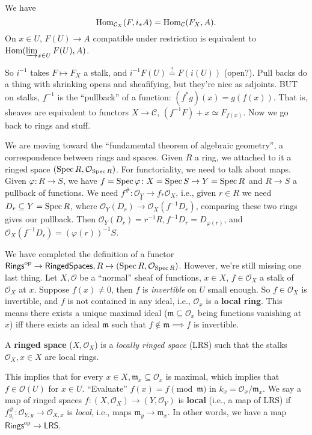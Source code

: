 \begin{lemma}
    We have \[
        \operatorname{Hom} _{\mathcal{C} _X}(F , i_* A)=\operatorname{Hom} _{\mathcal{C} }(F_X,A).
    \] On $x \in U$, $F(U) \to A$ compatible under restriction is equivalent to $\operatorname{Hom} (\varinjlim _{x \in U}F(U),A)$.
\end{lemma}So $ i ^{-1} $ takes $F \mapsto  F_X$ a stalk, and $i ^{-1}F(U) \overset{?}{=} F(i(U))$ (open?). Pull backs do a thing with shrinking opens and sheafifying, but they're nice as adjoints. BUT on stalks, $f^{-1}$ is the ``pullback'' of a function: $(f^* g)(x)= g(f(x))$. That is, sheaves are equivalent  to functors $X \to \mathcal{C} $, $(f ^{-1} F)+x \simeq F _{f(x)}$. Now we go back to rings and stuff.

We are moving toward the ``fundamental theorem of algebraic geometry'', a correspondence between rings and spaces. Given $R$ a ring, we attached to it a ringed space $( \operatorname{Spec} R, \mathcal{O} _{\operatorname{Spec} R})$. For functoriality, we need to talk about maps. Given $\varphi  \colon R \to S$, we have $f = \operatorname{Spec} \varphi  \colon X=\operatorname{Spec} S \to Y=\operatorname{Spec} R$ and $R \to S$ a pullback of functions. We need $f ^{\#} \colon \mathcal{O} _Y \to f_* \mathcal{O} _X$, i.e., given $r \in R$ we need $D_r \subseteq Y=\operatorname{Spec} R$, where $\mathcal{O} _Y(D_r) \xrightarrow{?} \mathcal{O} _X(f ^{-1} D_r)$, comparing these two rings gives our pullback. Then $\mathcal{O} _Y(D_r)=  r ^{-1} R, f ^{-1} D_r= D _{\varphi (r)}$, and $\mathcal{O} _X( f^{-1} D_r)= (\varphi  (r))^{-1}S$.

We have completed the definition of a functor $\mathsf{Rings} ^{\mathrm{op}}\to \mathsf{Ringed Spaces}, R \mapsto  (\operatorname{Spec} R, \mathcal{O} _{\operatorname{Spec} R})$. However, we're still missing one last thing. Let $X,\mathcal{O} $ be a ``normal'' sheaf of functions, $x \in X$, $f \in \mathcal{O} _X$ a stalk of $\mathcal{O} _X$ at $x$. Suppose $f(x)\neq 0$, then $f$ is \emph{invertible} on $U$ small enough. So $f \in \mathcal{O} _X$ is invertible, and $f$ is not contained in any ideal, i.e., $\mathcal{O} _x$ is a \textbf{local ring}. This means there exists a unique maximal ideal ($\mathfrak m \subseteq \mathcal{O} _x$ being functions vanishing at $x$) iff there exists an ideal $\mathfrak m$ such that $f\notin \mathfrak m \implies f$ is invertible.

\begin{definition}[]
    A \textbf{ringed space} ($X,\mathcal{O} _X$) is a \emph{locally ringed space} (LRS) such that the stalks $\mathcal{O} _X,x \in X$ are local rings. 
\end{definition}
This implies that for every $x \in X, \mathfrak m _x \subseteq \mathcal{O} _x$ is maximal, which implies that $f \in \mathcal{O} (U)$ for $x \in U$. ``Evaluate'' $f(x)= f \pmod{\mathfrak m}$ in $k_x =\mathcal{O} _x /\mathfrak m_x$. We say a map of ringed spaces $f \colon (X, \mathcal{O} _X) \to (Y, \mathcal{O} _Y)$ is \textbf{local} (i.e., a map of LRS) if $f^{\#}_{y_1} \colon \mathcal{O} _{Y,y} \to \mathcal{O} _{X,x}$ is \emph{local}, i.e., maps $\mathfrak m_y \to \mathfrak m_x$. In other words, we have a map $\mathsf{Rings} ^{\mathrm{op}}\to \mathsf{LRS} $.

